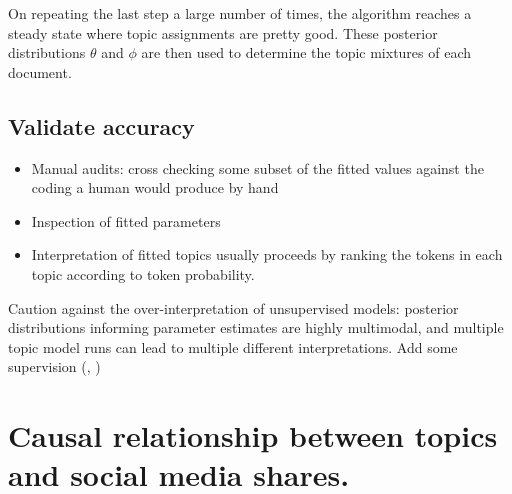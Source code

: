\documentclass[12pt,a4paper,notitlepage]{article}
\begin{document}
{On repeating the last step a large number of times, the algorithm reaches a steady state where topic assignments are pretty good. These posterior distributions $\theta$ and $\phi$ are then used to determine the topic mixtures of each document.

\subsection{Validate accuracy}

\begin{itemize}
	\item Manual audits: cross checking some subset of the fitted values against the coding a human would produce by hand
	\item Inspection of fitted parameters
	\item Interpretation of fitted topics usually proceeds by ranking the tokens in each topic according to token probability.
\end{itemize}

Caution against the over-interpretation of unsupervised models: posterior distributions informing parameter estimates are highly multimodal, and multiple topic model runs can lead to multiple different interpretations. Add some supervision (\citet{airoldi_improving_2016}, \citet{gentzkow_text_2017})  

\section{Causal relationship between topics and social media shares.}\label{ch_regression}


}
\end{document}
